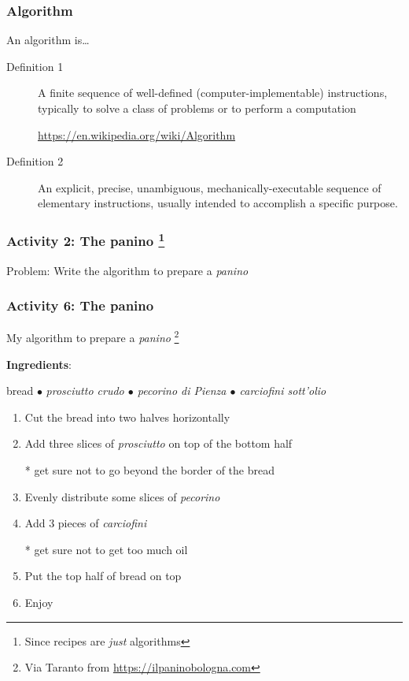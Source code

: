 \documentclass[xcolor=x11names,handout]{beamer}
\begin{document}

\begin{frame}
\frametitle{Algorithm}

An algorithm is\ldots
\bigskip

\begin{description}
 \item[Definition 1]
A finite sequence of \alert{well-defined (computer-implementable)
instructions}, typically to solve a class of problems or to perform a
computation

\begin{flushright}
\url{https://en.wikipedia.org/wiki/Algorithm}
\end{flushright}
\bigskip 			\pause

\item[Definition 2]
An explicit, precise, unambiguous, mechanically-executable sequence of
elementary instructions, usually intended to accomplish a specific purpose.

\begin{flushright}
\citet[p. 1]{Erickson:19}
\end{flushright}
\end{description}

\end{frame}

\begin{frame}
\frametitle{Activity 2: The panino%
\footnote{Since recipes are \textit{just} algorithms}
}

\alert{Problem:} Write the algorithm to prepare a \textit{panino}
\end{frame}

\begin{frame}
\frametitle{Activity 6: The panino}

\alert{My} algorithm to prepare a \textit{panino}%
\footnote{Via Taranto from \url{https://ilpaninobologna.com}}	\pause

\textbf{Ingredients}:

bread $\bullet$ \textit{prosciutto crudo $\bullet$ pecorino di Pienza $\bullet$
carciofini sott'olio}	\pause
\begin{enumerate}
 \item Cut the bread into two halves horizontally		\pause
 \item Add three slices of \textit{prosciutto} on top of the bottom half

	* get sure not to go beyond the border of the bread			\pause
 \item Evenly distribute some slices of \textit{pecorino}		\pause
 \item Add 3 pieces of \textit{carciofini}

		* get sure not to get too much oil\pause
 \item Put the top half of bread on top					\pause
 \item Enjoy
\end{enumerate}
\end{frame}
\end{document}
